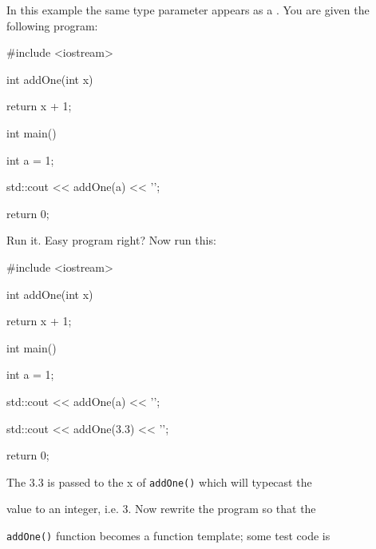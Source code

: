 In this example the same type parameter appears as a . You are given the following program:



\begin{consolethree}[escapeinside=||]

#include <iostream>



int addOne(int x)

{

    return x + 1;

}



int main()

{

    int a = 1;

    std::cout << addOne(a) << '\n';

    return 0;

}

\end{consolethree}



Run it. Easy program right? Now run this:



\begin{consolethree}[escapeinside=||]

#include <iostream>



int addOne(int x)

{

    return x + 1;

}



int main()

{

    int a = 1;

    std::cout << addOne(a) << '\n';

    std::cout << addOne(3.3) << '\n';

    return 0;

}

\end{consolethree}



The 3.3 is passed to the x of \texttt{addOne()} which will typecast the

value to an integer, i.e. 3. Now rewrite the program so that the

\texttt{addOne()} function becomes a function template; some test code is

